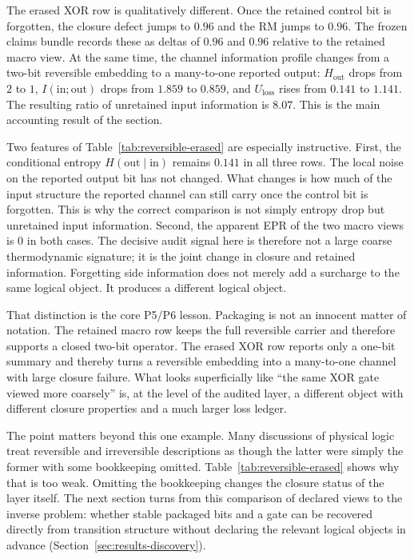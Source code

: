 \documentclass[11pt]{article}
\theoremstyle{definition}
\begin{document}
The erased XOR row is qualitatively different. Once the retained control bit is forgotten, the closure defect jumps to \(0.96\) and the RM jumps to \(0.96\). The frozen claims bundle records these as deltas of \(0.96\) and \(0.96\) relative to the retained macro view. At the same time, the channel information profile changes from a two-bit reversible embedding to a many-to-one reported output: \(H_{\mathrm{out}}\) drops from \(2\) to \(1\), \(I(\mathrm{in};\mathrm{out})\) drops from \(1.859\) to \(0.859\), and \(U_{\text{loss}}\) rises from \(0.141\) to \(1.141\). The resulting ratio of unretained input information is \(8.07\). This is the main accounting result of the section.

Two features of Table~\ref{tab:reversible-erased} are especially instructive. First, the conditional entropy \(H(\mathrm{out}\mid\mathrm{in})\) remains \(0.141\) in all three rows. The local noise on the reported output bit has not changed. What changes is how much of the input structure the reported channel can still carry once the control bit is forgotten. This is why the correct comparison is not simply entropy drop but unretained input information. Second, the apparent EPR of the two macro views is \(0\) in both cases. The decisive audit signal here is therefore not a large coarse thermodynamic signature; it is the joint change in closure and retained information. Forgetting side information does not merely add a surcharge to the same logical object. It produces a different logical object.

That distinction is the core P5/P6 lesson. Packaging is not an innocent matter of notation. The retained macro row keeps the full reversible carrier and therefore supports a closed two-bit operator. The erased XOR row reports only a one-bit summary and thereby turns a reversible embedding into a many-to-one channel with large closure failure. What looks superficially like ``the same XOR gate viewed more coarsely'' is, at the level of the audited layer, a different object with different closure properties and a much larger loss ledger.

The point matters beyond this one example. Many discussions of physical logic treat reversible and irreversible descriptions as though the latter were simply the former with some bookkeeping omitted. Table~\ref{tab:reversible-erased} shows why that is too weak. Omitting the bookkeeping changes the closure status of the layer itself. The next section turns from this comparison of declared views to the inverse problem: whether stable packaged bits and a gate can be recovered directly from transition structure without declaring the relevant logical objects in advance (Section~\ref{sec:results-discovery}).
\end{document}
